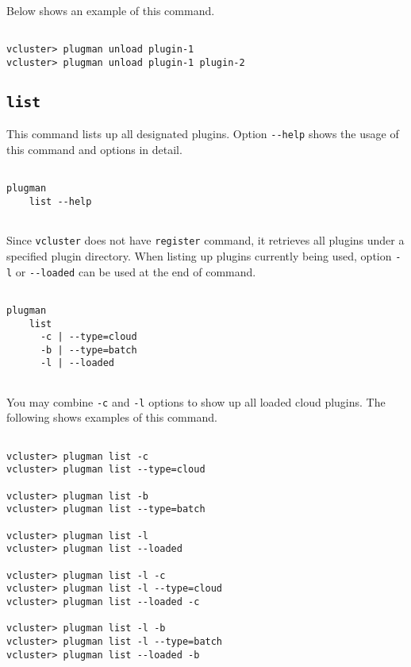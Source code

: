 \documentclass[11pt]{article}
\def \ttt{\texttt}
\def \vb{\verb}
\begin{document}
Below shows an example of this command.

\begin{Verbatim}[fontfamily=courier, fontsize = \small, obeytabs
=true, tabsize=4, frame=lines]

vcluster> plugman unload plugin-1
vcluster> plugman unload plugin-1 plugin-2

\end{Verbatim}




\subsection{\ttt{list}}
This command lists up all designated plugins. Option \vb+--help+ shows the usage of this command and options in detail.

\begin{Verbatim}[fontfamily=courier, fontsize = \small, obeytabs
=true, tabsize=4, frame=lines]

plugman 
    list --help
      
\end{Verbatim}


Since \vb+vcluster+ does not have \vb+register+ command, it retrieves all plugins under a specified plugin directory. When listing up plugins currently being used, option \vb+-l+ or \vb+--loaded+ can be used at the end of command.

\begin{Verbatim}[fontfamily=courier, fontsize = \small, obeytabs
=true, tabsize=4, frame=lines]

plugman 
    list
      -c | --type=cloud 
      -b | --type=batch
      -l | --loaded
      
\end{Verbatim}

You may combine \vb+-c+ and \vb+-l+ options to show up all loaded cloud plugins. The following shows examples of this command.

\begin{Verbatim}[fontfamily=courier, fontsize = \small, obeytabs
=true, tabsize=4, frame=lines]

vcluster> plugman list -c
vcluster> plugman list --type=cloud

vcluster> plugman list -b
vcluster> plugman list --type=batch

vcluster> plugman list -l
vcluster> plugman list --loaded

vcluster> plugman list -l -c
vcluster> plugman list -l --type=cloud
vcluster> plugman list --loaded -c

vcluster> plugman list -l -b
vcluster> plugman list -l --type=batch
vcluster> plugman list --loaded -b

\end{Verbatim}
\end{document}
